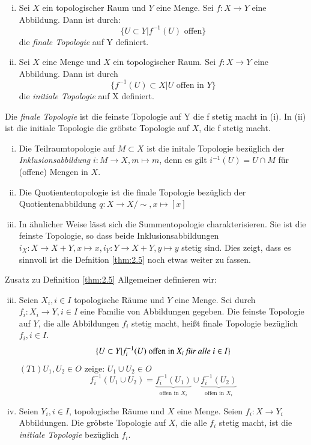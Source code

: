 \documentclass[a4paper,10pt]{scrartcl}
\begin{document}
\begin{df}\label{thm:2.5}
\begin{enumerate}[(i)]
\item Sei $ X $ ein topologischer Raum und $ Y $ eine Menge.  Sei $ f: X\to Y$ eine Abbildung.  Dann ist durch:
\[
\{U\subset Y|f^{-1}(U) \text{ offen} \}
\]
die \emph{finale Topologie} auf Y definiert.
\item Sei $ X $ eine Menge und $ X $ ein topologischer Raum.  Sei $ f: X\to Y $ eine Abbildung.  Dann ist durch 
\[
\{ f^{-1}(U)\subset X| U \text{ offen in } Y\}
\]
die \emph{initiale Topologie} auf X definiert.
\end{enumerate}
\end{df}
\begin{note*}
Die \emph{finale Topologie} ist die feinste Topologie auf Y die f stetig macht in (i). In (ii) ist die initiale Topologie die gröbste Topologie auf $ X $, die f stetig macht.
\end{note*}
\begin{exs*}
\begin{enumerate}[(i)]
\item Die Teilraumtopologie auf $M\subset X$ ist die initale Topologie bezüglich der \emph{Inklusionsabbildung} $ i:M\to X,m\mapsto m $, denn es gilt $ i^{-1}(U)=U\cap M $ für (offene) Mengen in $ X $.
\item Die Quotiententopologie ist die finale Topologie bezüglich der Quotientenabbildung  $ q: X\to X/\sim, x\mapsto [x] $
\item In ähnlicher Weise lässt sich die Summentopologie charakterisieren.  Sie ist die feinste Topologie, so dass beide Inklusionsabbildungen
$ i_X:X\to X+Y, x \mapsto x, i_Y: Y\to X+Y,y\mapsto y $ stetig sind.  Dies zeigt, dass es sinnvoll ist die Defnition \ref{thm:2.5} noch etwas weiter zu fassen.
\end{enumerate}
\end{exs*}
\begin{seg}{Zusatz zu Definition \ref{thm:2.5}}
Allgemeiner definieren wir:
\begin{enumerate}[(i)]
\setcounter{enumi}{2}
\item Seien $X_i, i\in I$ topologische Räume und $ Y $ eine Menge. Sei durch $f_i:X_i\to Y, i\in I$ eine Familie von Abbildungen gegeben. Die feinste Topologie auf $ Y $, die alle Abbildungen $f_i$ stetig macht, heißt finale Topologie bezüglich $ f_i,i\in I $.
\[
\{U\subset Y|f^{-1}_i(U) \text{ offen in }X_i \text{ \emph{für alle} } i\in I\}
\]
$(T1) U_1, U_2\in O$ zeige: $U_1\cup U_2\in O$
\[f^{-1}_i(U_1\cup U_2)=\underbrace{f^{-1}_i(U_1)}_{\text{offen in } X_i}\cup \underbrace{f^{-1}_i(U_2)}_{\text{offen in } X_i}\]
\item Seien $ Y_i, i\in I $, topologische Räume und $ X $ eine Menge.  Seien $ f_i: X\to Y_i $ Abbildungen.  Die gröbste Topologie auf $ X $, die alle $f_i$ stetig macht, ist die \emph{initiale Topologie} bezüglich $f_i$. 
\end{enumerate}
\end{seg}
\end{document}
